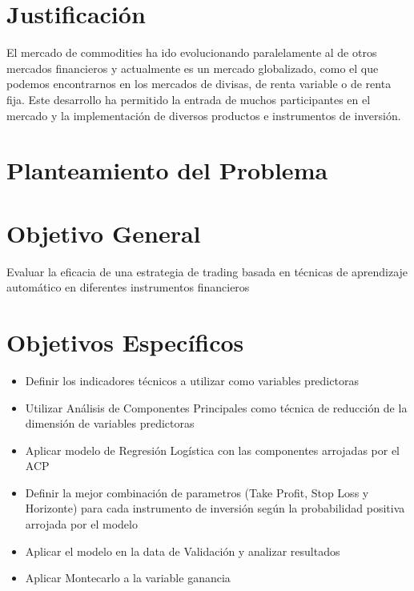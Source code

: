\documentclass[a4paper,12pt]{Latex/Classes/PhDthesisPSnPDF}
\begin{document}
\section{Justificación}

El mercado de commodities ha ido evolucionando paralelamente al de otros mercados financieros y actualmente es un mercado globalizado, como el que podemos encontrarnos en los mercados de divisas, de renta variable o de renta fija. Este desarrollo ha permitido la entrada de muchos participantes en el mercado y la implementación de diversos productos e instrumentos de inversión.\\

\section{Planteamiento del Problema}


\section{Objetivo General}

Evaluar la eficacia de una estrategia de trading basada en técnicas de aprendizaje automático en diferentes instrumentos financieros

\section{Objetivos Específicos}

\begin{itemize}
\item Definir los indicadores técnicos a utilizar como variables predictoras
\item Utilizar Análisis de Componentes Principales como técnica de reducción de la dimensión de variables predictoras
\item Aplicar modelo de Regresión Logística con las componentes arrojadas por el ACP
\item Definir la mejor combinación de parametros (Take Profit, Stop Loss y Horizonte) para cada instrumento de inversión según la probabilidad positiva arrojada por el modelo
\item Aplicar el modelo en la data de Validación y analizar resultados
\item Aplicar Montecarlo a la variable ganancia
\end{itemize}

\end{document}
